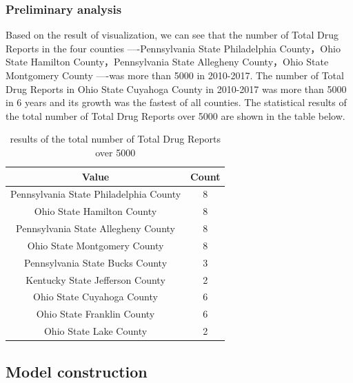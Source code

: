 \documentclass{mcmthesis}
\begin{document}
\subsubsection{Preliminary analysis}
Based on the result of visualization, we can see that the number of Total Drug Reports in the four counties ----Pennsylvania State Philadelphia County，Ohio State Hamilton County，Pennsylvania State Allegheny County，Ohio State Montgomery County
----was more than 5000 in 2010-2017. The number of Total Drug Reports in Ohio State Cuyahoga County in 2010-2017 was more than 5000 in 6 years and its growth was the fastest of all counties. The statistical results of the total number of Total Drug Reports over 5000 are shown in the table below. 
\begin{table}[htbp]
  \centering
  \caption{results of the total number of Total Drug Reports over 5000}
    \begin{tabular}{cc}
    \toprule
    Value & Count \\
    \midrule
    Pennsylvania State Philadelphia County & 8 \\
    Ohio State Hamilton County & 8 \\
    Pennsylvania State Allegheny County & 8 \\
    Ohio State Montgomery County & 8 \\
    Pennsylvania State Bucks County & 3 \\
    Kentucky State Jefferson County & 2 \\
    Ohio State Cuyahoga County & 6 \\
    Ohio State Franklin County & 6 \\
    Ohio State Lake County & 2 \\
    \bottomrule
    \end{tabular}%
  \label{tab:results of the total number of Total Drug Reports over 5000}%
\end{table}%



\subsection{Model construction}
\end{document}
